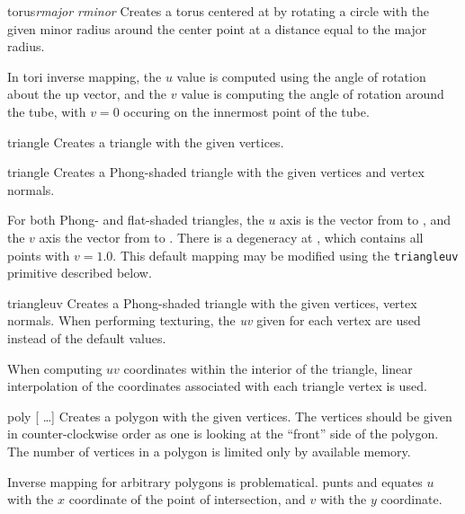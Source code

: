 \begin{defprim}{torus}{{\em rmajor rminor}  }
	Creates a torus centered at  by rotating
	a circle with the given minor radius around the center
	point at a distance equal to the major radius. 
\end{defprim}
In tori inverse mapping,
the $u$ value is computed using the angle of rotation about the
up vector, and the $v$ value is computing the angle of rotation
around the tube, with $v=0$ occuring on the innermost point of the tube.

\begin{defprim}{triangle}{  }
	Creates a triangle with the given vertices.
\end{defprim}

\begin{defprim}{triangle}{   
	 }
	Creates a Phong-shaded triangle with the given vertices and
	vertex normals.
\end{defprim}
For both Phong- and flat-shaded triangles, the $u$ axis is the
vector from  to , and the $v$ axis the vector
from  to .  There is a degeneracy at
, which contains all points with $v = 1.0$.  This default
mapping may be modified using the {\tt triangleuv} primitive described
below.

\begin{defprim}{triangleuv}{  
    
    }
	Creates a Phong-shaded triangle with the given vertices,
	vertex normals.  When performing texturing, the
	{\em uv} given for each vertex are used instead of the
	default values.
\end{defprim}
When computing $uv$ coordinates within the interior of the
triangle, linear interpolation of the coordinates associated with
each triangle vertex is used.

\begin{defprim}{poly}{   [ \ldots ]}
	Creates a polygon with the given vertices. The vertices
	should be given in counter-clockwise order as one is
	looking at the ``front'' side of the polygon.  The number of
	vertices in a polygon is limited only by available memory.
\end{defprim}
Inverse mapping for arbitrary polygons is problematical.
{\Rayshade}
punts and equates $u$ with the $x$ coordinate of the point of intersection,
and $v$ with the $y$ coordinate.

